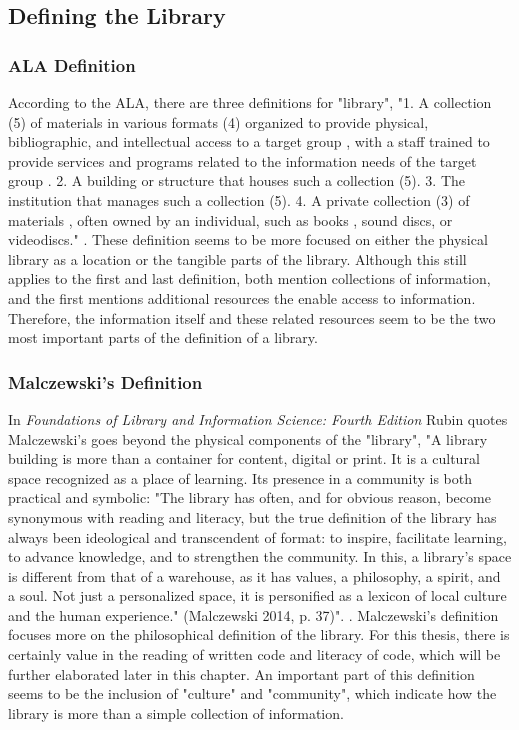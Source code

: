 \subsection{Defining the Library}

\subsubsection{ALA Definition}
According to the ALA, there are three definitions for "library", "1. A collection (5) of materials in various formats (4) organized to provide physical, bibliographic, and intellectual access to a target group , with a staff trained to provide services and programs related to the information needs of the target group . 2. A building or structure that houses such a collection (5). 3. The institution that manages such a collection (5). 4. A private collection (3) of materials , often owned by an individual, such as books , sound discs, or videodiscs." \cite{glossary2013}. These definition seems to be more focused on either the physical library as a location or the tangible parts of the library. Although this still applies to the first and last definition, both mention collections of information, and the first mentions additional resources the enable access to information. Therefore, the information itself and these related resources seem to be the two most important parts of the definition of a library. 

\subsubsection{Malczewski's Definition}
In \textit{Foundations of Library and Information Science: Fourth Edition} Rubin quotes Malczewski's goes beyond the physical components of the "library", "A library building is more than a container for content, digital or print. It is a cultural space recognized as a place of learning. Its presence in a community is both practical and symbolic: "The library has often, and for obvious reason, become synonymous with reading and literacy, but the true definition of the library has always been ideological and transcendent of format: to inspire, facilitate learning, to advance knowledge, and to strengthen the community. In this, a library’s space is different from that of a warehouse, as it has values, a philosophy, a spirit, and a soul. Not just a personalized space, it is personified as a lexicon of local culture and the human experience." (Malczewski 2014, p. 37)". \cite{rubin2016foundationslis} \cite{malczewski2014meaningful}. Malczewski's definition focuses more on the philosophical definition of the library. For this thesis, there is certainly value in the reading of written code and literacy of code, which will be further elaborated later in this chapter. An important part of this definition seems to be the inclusion of "culture" and "community", which indicate how the library is more than a simple collection of information. 

